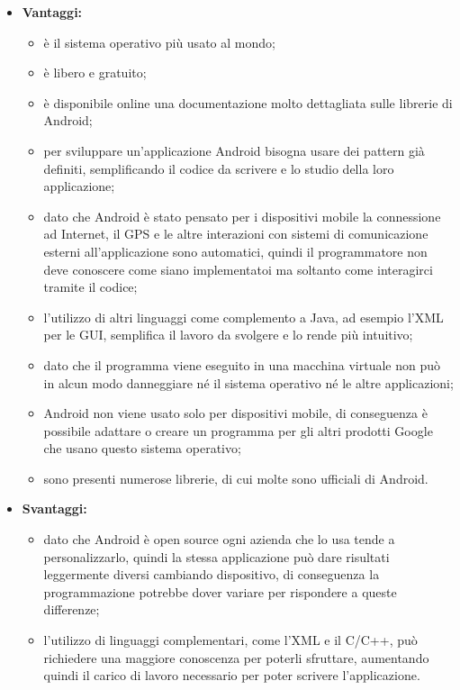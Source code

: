 	\begin{itemize}
		\item \textbf{Vantaggi:}
			\begin{itemize}
				\item è il sistema operativo più usato al mondo;
				\item è libero e gratuito;
				\item è disponibile online una documentazione molto dettagliata sulle librerie di Android;
				\item per sviluppare un'applicazione Android bisogna usare dei pattern già definiti, semplificando il codice da scrivere e lo studio della loro applicazione;
				\item dato che Android è stato pensato per i dispositivi mobile la connessione ad Internet, il GPS e le altre interazioni con sistemi di comunicazione esterni all'applicazione sono automatici, quindi il programmatore non deve conoscere come siano implementatoi ma soltanto come interagirci tramite il codice;
				\item l'utilizzo di altri linguaggi come complemento a Java, ad esempio l'XML per le GUI, semplifica il lavoro da svolgere e lo rende più intuitivo;
				\item dato che il programma viene eseguito in una macchina virtuale non può in alcun modo danneggiare né il sistema operativo né le altre applicazioni;
				\item Android non viene usato solo per dispositivi mobile, di conseguenza è possibile adattare o creare un programma per gli altri prodotti Google che usano questo sistema operativo;
				\item sono presenti numerose librerie, di cui molte sono ufficiali di Android.
			\end{itemize}
		\item \textbf{Svantaggi:}
			\begin{itemize}
				\item dato che Android è open source ogni azienda che lo usa tende a personalizzarlo, quindi la stessa applicazione può dare risultati leggermente diversi cambiando dispositivo, di conseguenza la programmazione potrebbe dover variare per rispondere a queste differenze;
				\item l'utilizzo di linguaggi complementari, come l'XML e il C/C++, può richiedere una maggiore conoscenza per poterli sfruttare, aumentando quindi il carico di lavoro necessario per poter scrivere l'applicazione.
			\end{itemize}
	\end{itemize}
	
